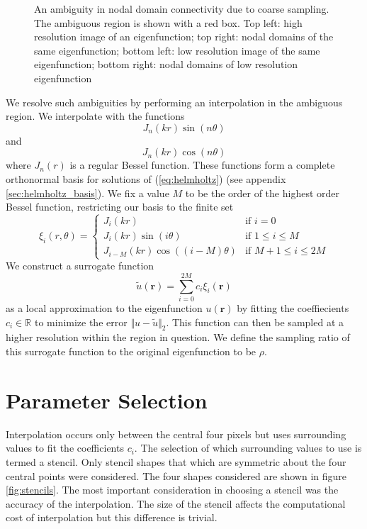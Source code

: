 \documentclass{report}
\newcommand{\rr}[0]{\mathbf{r}}
\begin{document}
\begin{figure}
\begin{center}
    \caption{An ambiguity in nodal domain connectivity due to coarse sampling. The ambiguous region is shown with a red box. Top left: high resolution image of an eigenfunction; top right: nodal domains of the same eigenfunction; bottom left: low resolution image of the same eigenfunction; bottom right: nodal domains of low resolution eigenfunction}
    \label{fig:interpolation_sample}
  \end{center}
\end{figure}

We resolve such ambiguities by performing an interpolation in the ambiguous region. We interpolate with the functions
\[
J_{n}(k r) \sin(n \theta)
\]
and
\[
J_{n}(k r) \cos(n \theta)
\]
where $J_{n}(r)$ is a regular Bessel function. These functions form a complete orthonormal basis for solutions of (\ref{eq:helmholtz}) (see appendix \ref{sec:helmholtz_basis}). We fix a value $M$ to be the order of the highest order Bessel function, restricting our basis to the finite set
\begin{equation}
  \label{eq:interp_functions}
  \xi_{i}(r, \theta)=\begin{cases}
  J_{i}(k r) & \text{if }i=0\\
  J_{i}(k r)\sin(i\theta) & \text{if }1 \le i \le M\\
  J_{i-M}(k r)\cos((i-M)\theta) & \text{if }M+1 \le i \le 2M
  \end{cases}
\end{equation}
We construct a surrogate function
\[
  \tilde{u}(\rr) = \sum_{i=0}^{2M} c_{i} \xi_{i}(\rr)
\]
as a local approximation to the eigenfunction $u(\rr)$ by fitting the coeffiecients $c_{i} \in \mathbb{R}$ to minimize the error $\Vert u - \tilde{u} \Vert_{2}$. This function can then be sampled at a higher resolution within the region in question. We define the sampling ratio of this surrogate function to the original eigenfunction to be $\rho$.

\chapter{Parameter Selection}
\label{sec:params}
Interpolation occurs only between the central four pixels but uses surrounding values to fit the coefficients $c_i$. The selection of which surrounding values to use is termed a stencil. Only stencil shapes that which are symmetric about the four central points were considered. The four shapes considered are shown in figure \ref{fig:stencils}. The most important consideration in choosing a stencil was the accuracy of the interpolation. The size of the stencil affects the computational cost of interpolation but this difference is trivial.
\end{document}
